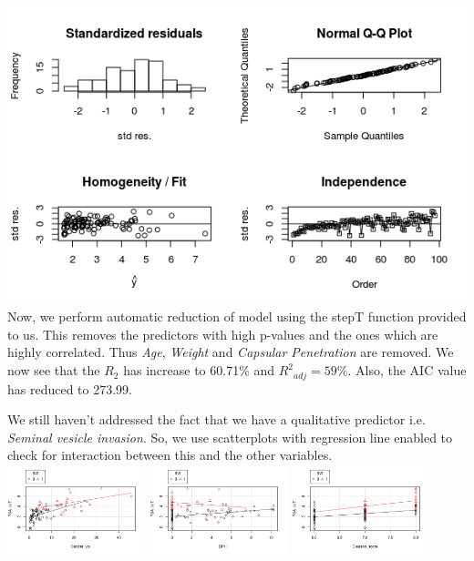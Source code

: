\documentclass{scrartcl}
\begin{document}
\includegraphics[width=\textwidth]{psa_transform_check.png}\\
Now, we perform automatic reduction of model using the stepT function provided to us. This removes the predictors with high p-values and the ones which are highly correlated. Thus \textit{Age}, \textit{Weight} and \textit{Capsular Penetration} are removed. We now see that the $R_2$ has increase to 60.71\% and ${R^2}_{adj} = 59\%$. Also, the AIC value has reduced to 273.99.
\par
We still haven't addressed the fact that we have a qualitative predictor i.e. \textit{Seminal vesicle invasion}. So, we use scatterplots with regression line enabled to check for interaction between this and the other variables.\\
\includegraphics[width=0.3\textwidth]{svi_cancervol.png}
\includegraphics[width=0.3\textwidth]{svi_bph.png}
\includegraphics[width=0.3\textwidth]{svi_gscore.png}
\end{document}
